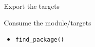 \documentclass{beamer}
\begin{document}
\begin{frame}[fragile]{Export the targets}%
	\vspace{1cm}
	\begin{block}{\small Consume the module/targets}
		\begin{itemize}\small%
			\item \texttt{find\_package()}%
		\end{itemize}
	\end{block}
\end{frame}
\end{document}
